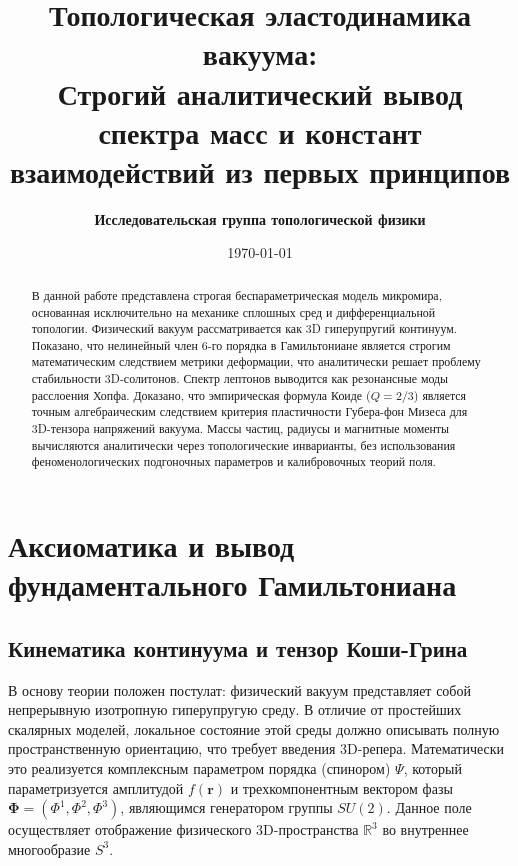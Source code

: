 \documentclass[12pt,a4paper]{article}
\title{\textbf{Топологическая эластодинамика вакуума:\\ Строгий аналитический вывод спектра масс и констант взаимодействий из первых принципов}}
\author{\textbf{Исследовательская группа топологической физики}}
\date{\today}
\begin{document}
	
	\maketitle
	
	\begin{abstract}
		В данной работе представлена строгая беспараметрическая модель микромира, основанная исключительно на механике сплошных сред и дифференциальной топологии. Физический вакуум рассматривается как 3D гиперупругий континуум. Показано, что нелинейный член 6-го порядка в Гамильтониане является строгим математическим следствием метрики деформации, что аналитически решает проблему стабильности 3D-солитонов. 
		Спектр лептонов выводится как резонансные моды расслоения Хопфа. Доказано, что эмпирическая формула Коиде ($Q=2/3$) является точным алгебраическим следствием критерия пластичности Губера-фон Мизеса для 3D-тензора напряжений вакуума. Массы частиц, радиусы и магнитные моменты вычисляются аналитически через топологические инварианты, без использования феноменологических подгоночных параметров и калибровочных теорий поля.
	\end{abstract}
	
	\tableofcontents
	\newpage
	
\section{Аксиоматика и вывод фундаментального Гамильтониана}

\subsection{Кинематика континуума и тензор Коши-Грина}
В основу теории положен постулат: физический вакуум представляет собой непрерывную изотропную гиперупругую среду. В отличие от простейших скалярных моделей, локальное состояние этой среды должно описывать полную пространственную ориентацию, что требует введения 3D-репера. Математически это реализуется комплексным параметром порядка (спинором) $\Psi$, который параметризуется амплитудой $f(\mathbf{r})$ и трехкомпонентным вектором фазы $\boldsymbol{\Phi} = (\Phi^1, \Phi^2, \Phi^3)$, являющимся генератором группы $SU(2)$. Данное поле осуществляет отображение физического 3D-пространства $\mathbb{R}^3$ во внутреннее многообразие $S^3$.
\end{document}
